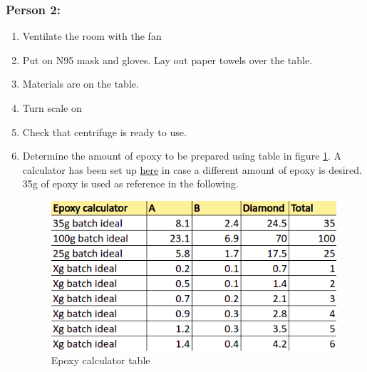 \documentclass[12pt]{cornelltfpxsop}
\begin{document}
\begin{paracol}{2}
\subsubsection*{Person 2:}
\begin{enumerate}
        \item Ventilate the room with the fan
        \item Put on N95 mask and gloves. Lay out paper towels over the table.
        \item Materials are on the table.
        \item Turn scale on
        \item Check that centrifuge is ready to use.        
        \item Determine the amount of epoxy to be prepared using table in figure \ref{fig:epoxy_calc}.
        A calculator has been set up \href{https://cornellprod.sharepoint.com/:x:/r/sites/TFPXDeemanufacturing/_layouts/15/Doc.aspx?sourcedoc=%7B1955F9BA-B34C-40AF-83B5-E2F571FD91B1%7D&file=Epoxy%20mixing%20calculator.xlsx&action=default&mobileredirect=true}{here} in case a different amount of epoxy is desired. 35g of epoxy is used as reference in the following.
            \begin{center}
            \begin{figure}[h!]
                \centering
                \includegraphics[width=0.8\linewidth]{img/epoxy_calc.png}
                \caption{Epoxy calculator table}
                \label{fig:epoxy_calc}
            \end{figure}
        \end{center}

\end{enumerate}
\end{paracol}
\end{document}
